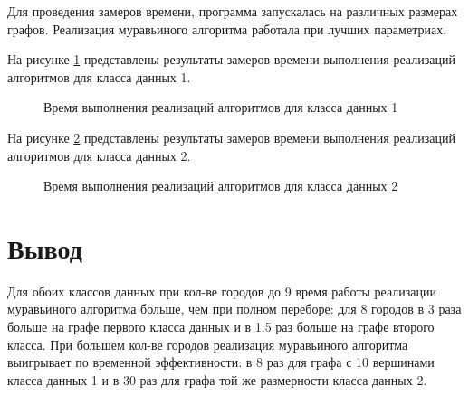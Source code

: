 Для проведения замеров времени, программа запускалась на различных размерах графов.
Реализация муравьиного алгоритма работала при лучших параметриах.

На рисунке \ref{img:g1} представлены результаты замеров времени выполнения реализаций алгоритмов для класса данных 1.

\begin{figure}[h!]
	\centering
	\caption{Время выполнения реализаций алгоритмов для класса данных 1}
	\label{img:g1}
\end{figure}
\clearpage

На рисунке \ref{img:g2} представлены результаты замеров времени выполнения реализаций алгоритмов для класса данных 2.

\begin{figure}[h!]
	\centering
	\caption{Время выполнения реализаций алгоритмов для класса данных 2}
	\label{img:g2}
\end{figure}

\clearpage
\section*{Вывод}
Для обоих классов данных при кол-ве городов до 9 время работы реализации муравьиного алгоритма больше, чем при полном переборе: для 8 городов в 3 раза больше на графе первого класса данных и в 1.5 раз больше на графе второго класса.
При большем кол-ве городов  реализация муравьиного алгоритма выигрывает по временной эффективности: в 8 раз для графа с 10 вершинами класса данных 1 и в 30 раз для графа той же размерности класса данных 2.

